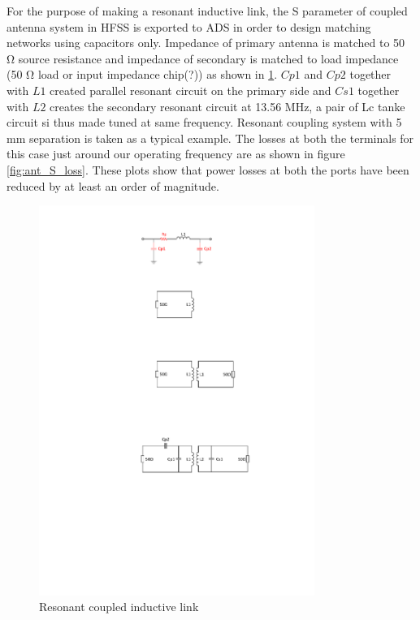 \documentclass[12pt,a4paper,UKenglish]{article}
\begin{document}
For the purpose of making a resonant inductive link, the S parameter of coupled antenna system in HFSS 
is exported to ADS in order to design matching networks using capacitors only. Impedance of  primary antenna is 
matched to 50 \si{\ohm} source resistance and impedance of secondary is matched to load impedance (50 \si{\ohm} load or input 
impedance chip(?)) as shown in \ref{fig:ant_couple_resonant}. $Cp1$ and $Cp2$ together with $L1$ created parallel resonant circuit 
on the primary side and $Cs1$ together with $L2$ creates the secondary resonant circuit at 13.56 MHz, a pair of
 Lc tanke circuit si thus made tuned at same frequency. Resonant coupling system with 5 mm separation is taken as a typical example. The losses at both the terminals for this case 
just around our operating frequency are as shown in figure \ref{fig:ant_S_loss}. These plots show that power 
losses at both the ports have been reduced by at least an order of magnitude.

\begin{figure}[!htbp] %
   \centering
   \includegraphics[width=0.8\textwidth]{img/ant_couple_resonant.pdf} 
   \caption{Resonant coupled inductive link}
   \label{fig:ant_couple_resonant}
\end{figure}
\end{document}
